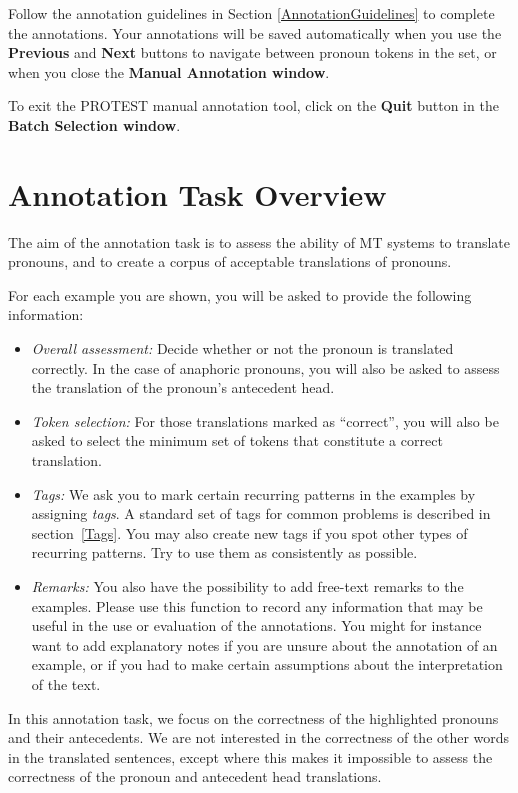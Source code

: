 \documentclass[11pt]{article} %
\begin{document}
Follow the annotation guidelines in Section \ref{AnnotationGuidelines} to complete the annotations. Your annotations will be saved automatically when you use the \textbf{Previous} and \textbf{Next} buttons to navigate between pronoun tokens in the set, or when you close the \textbf{Manual Annotation window}.

To exit the PROTEST manual annotation tool, click on the \textbf{Quit} button in the \textbf{Batch Selection window}.


\section{Annotation Task Overview}
The aim of the annotation task is to assess the ability of MT systems to translate pronouns, and to create a corpus of acceptable translations of pronouns.

For each example you are shown, you will be asked to provide the following information:
\begin{itemize}
\item\emph{Overall assessment:} Decide whether or not the pronoun is translated
	correctly. In the case of anaphoric pronouns, you will also be asked to
	assess the translation of the pronoun's antecedent head.
\item\emph{Token selection:} For those translations marked as ``correct'', you
	will also be asked to select the minimum set of tokens that constitute
	a correct translation.
\item\emph{Tags:} We ask you to mark certain recurring patterns in the examples
	by assigning \emph{tags}. A standard set of tags for common problems is
	described in section~\ref{Tags}. You may also create new tags if you spot
	other types of recurring patterns. Try to use them as consistently as
	possible.
\item\emph{Remarks:} You also have the possibility to add free-text remarks to the examples.
	Please use this function to record any information that may be useful in
	the use or evaluation of the annotations. You might for instance want to add
	explanatory notes if you are unsure about the annotation of an example, or if
	you had to make certain assumptions about the interpretation of the text.
\end{itemize}

In this annotation task, we focus on the correctness of the highlighted
pronouns and their antecedents. We are not interested in the correctness of the
other words in the translated sentences, except where this makes it impossible
to assess the correctness of the pronoun and antecedent head translations.
\end{document}

